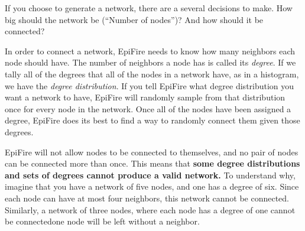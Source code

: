 \documentclass{article}
\begin{document}
If you choose to generate a network, there are a several decisions to make.  How big should the network be (``Number of nodes'')?  And how should it be connected?

In order to connect a network, EpiFire needs to know how many neighbors each node should have.  The number of neighbors 
a node has is called its \textit{degree}. If we tally all of the degrees that all of the nodes in a network have, as in 
a histogram, we have the \textit{degree distribution}.  If you tell EpiFire what degree distribution you want a network 
to have, EpiFire will randomly sample from that distribution once for every node in the network.  Once all of the nodes
have been assigned a degree, EpiFire does its best to find a way to randomly connect them given those degrees.  

EpiFire will not allow nodes to be connected to themselves, and no pair of nodes can be connected more than once.  This 
means that \textbf{some degree distributions and sets of degrees cannot produce a valid network.}  To understand why, 
imagine that you have a network of five nodes, and one has a degree of six.  Since each node can have at most four 
neighbors, this network cannot be connected.  Similarly, a network of three nodes, where each node has a degree of one 
cannot be connected\textemdash one node will be left without a neighbor.
\end{document}
